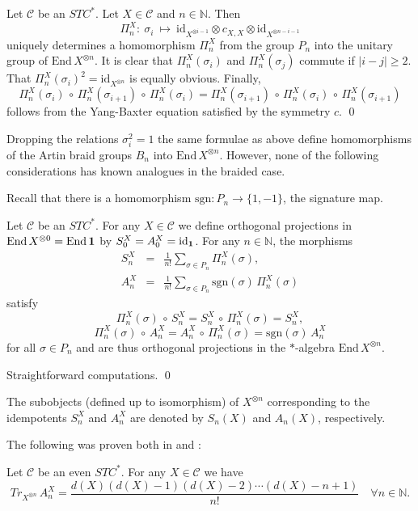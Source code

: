 \documentclass[11pt]{article}
\theoremstyle{definition}
\theoremstyle{definition}
\theoremstyle{remark}
\def\2#1{{\mathcal #1}}
\def\7#1{{\mathbb #1}}
\def\1#1{{\bf #1}}
\newcommand{\End}{\mathrm{End}}
\newcommand{\mcirc}{\,\circ\,}
\newcommand{\rarr}{\rightarrow}
\def\id{\mathrm{id}}
\begin{document}
\blemma Let $\2C$ be an $STC^*$. Let $X\in\2C$ and $n\in\7N$. Then 
\[ \Pi^X_n: \ \sigma_i \ \mapsto \ \id_{X^{\otimes i-1}}\otimes c_{X,X}\otimes\id_{X^{\otimes
  n-i-1}} \] 
uniquely determines a homomorphism $\Pi^X_n$ from the group $P_n$ into the unitary group of
$\End\,X^{\otimes n}$. 
\elemma
\prf It is clear that $\Pi^X_n(\sigma_i)$ and $\Pi^X_n(\sigma_j)$ commute if $|i-j|\ge 2$. 
That $\Pi^X_n(\sigma_i)^2=\id_{X^{\otimes n}}$ is equally obvious. Finally, 
\[ \Pi^X_n(\sigma_i)\mcirc \Pi^X_n(\sigma_{i+ 1})\mcirc \Pi^X_n(\sigma_i)=
  \Pi^X_n(\sigma_{i+ 1})\mcirc \Pi^X_n(\sigma_i)\mcirc \Pi^X_n(\sigma_{i+ 1})  \]
follows from the Yang-Baxter equation satisfied by the symmetry $c$.
\qed

\brem 
Dropping the relations $\sigma_i^2=1$ the same formulae as above define homomorphisms of the Artin
braid groups $B_n$ into $\End\,X^{\otimes n}$. However, none of the following considerations has
known analogues in the braided case. 
\erem

Recall that there is a homomorphism $\mathrm{sgn}: P_n\rarr\{1,-1\}$, the signature map.

\blemma \label{l-proj} 
Let $\2C$ be an $STC^*$. For any $X\in\2C$ we define orthogonal projections in 
$\End\,X^{\otimes 0}=\End\,\11$ by $S_0^X=A_0^X=\id_\11$. For any $n\in\7N$, the morphisms 
\begin{eqnarray*} 
S_n^X &=& \frac{1}{n!} \sum_{\sigma\in P_n} \Pi_n^X(\sigma), \\
A_n^X &=& \frac{1}{n!} \sum_{\sigma\in P_n} \mathrm{sgn}(\sigma) \,\Pi_n^X(\sigma)
\end{eqnarray*}
satisfy 
\[ \Pi_n^X(\sigma) \mcirc  S_n^X = S_n^X\mcirc  \Pi_n^X(\sigma) = S_n^X, \]
\[ \Pi_n^X(\sigma) \mcirc  A_n^X = A_n^X\mcirc  \Pi_n^X(\sigma) =  \mathrm{sgn}(\sigma)\,A_n^X \]
for all $\sigma\in P_n$ and are thus orthogonal projections in the $*$-algebra $\End\,X^{\otimes n}$. 
\elemma

\prf Straightforward computations. \qed

\bdefin 
The subobjects (defined up to isomorphism) of $X^{\otimes n}$ corresponding to the idempotents
$S_n^X$ and $A_n^X$ are denoted by $S_n(X)$ and $A_n(X)$, respectively.
\edefin

The following was proven both in \cite{DR} and \cite{del}:

\bprop \label{p-trace-an} 
Let $\2C$ be an even $STC^*$. For any $X\in\2C$ we have
\begin{equation} \label{e-traxn}
Tr_{X^{\otimes n}}\,A_n^X = \frac{d(X)(d(X)-1)(d(X)-2)\cdots (d(X)-n+1)}{n!} \quad \forall n\in\7N.
\end{equation}
\eprop
\end{document}
